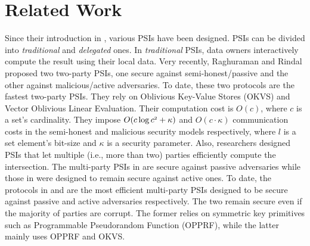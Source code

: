 
\vs

\section{Related Work}\label{sec::related-work}


Since their introduction in \cite{DBLP:conf/eurocrypt/FreedmanNP04}, various PSIs have been designed. PSIs can be divided into \textit{traditional} and \textit{delegated} ones.   
%
In \textit{traditional} PSIs, data owners interactively compute the result using their local data. 
%
Very recently, Raghuraman and Rindal \cite{RaghuramanR22} proposed two two-party PSIs, one secure against semi-honest/passive and the other against malicious/active adversaries. To date, these two protocols are the fastest two-party PSIs. They rely on  Oblivious Key-Value Stores (OKVS)  and Vector Oblivious Linear Evaluation. Their  computation cost is $O(c)$, where $c$ is  a set's cardinality.  They impose $O(c\log c^{\scriptscriptstyle 2}+\kappa)$ and $O(c\cdot \kappa)$ communication costs in the semi-honest and malicious security models respectively, where $l$ is a set element's bit-size and  $\kappa$ is a security parameter.  
%
Also, researchers designed PSIs that let multiple (i.e., more than two) parties efficiently compute the intersection. The multi-party PSIs in  \cite{DBLP:conf/scn/InbarOP18,DBLP:conf/ccs/KolesnikovMPRT17} are secure against  passive adversaries while those in \cite{Ben-EfraimNOP21,GhoshN19,ZhangLLJL19,DBLP:conf/ccs/KolesnikovMPRT17,NevoTY21} were designed to remain secure against  active ones.  To date, the  protocols  in   \cite{DBLP:conf/ccs/KolesnikovMPRT17} and  \cite{NevoTY21} are the most  efficient multi-party PSIs  designed to be  secure against passive and active  adversaries respectively. The two remain secure even if the majority of parties are corrupt.  
%
%
The former relies on symmetric key primitives such as  Programmable Pseudorandom Function (OPPRF), while the latter mainly uses OPPRF and OKVS. 

